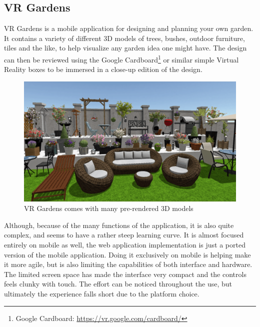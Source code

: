 \subsection{VR Gardens}
VR Gardens is a mobile application for designing and planning your own garden. It contains a variety of different 3D models of trees, bushes, outdoor furniture, tiles and the like, to help visualize any garden idea one might have. The design can then be reviewed using the Google Cardboard\footnote{Google Cardboard: \url{https://vr.google.com/cardboard/}} or similar simple Virtual Reality boxes to be immersed in a close-up edition of the design.
\begin{figure}[H]
	\centering
	\includegraphics[width=0.6\linewidth]{figure/Analysis/vrgardens}
	\caption{VR Gardens comes with many pre-rendered 3D models}
	\label{fig:vrgardens}
\end{figure}
Although, because of the many functions of the application, it is also quite complex, and seems to have a rather steep learning curve. It is almost focused entirely on mobile as well, the web application implementation is just a ported version of the mobile application. Doing it exclusively on mobile is helping make it more agile, but is also limiting the capabilities of both interface and hardware. The limited screen space has made the interface very compact and the controls feels clunky with touch. The effort can be noticed throughout the use, but ultimately the experience falls short due to the 	platform choice.

